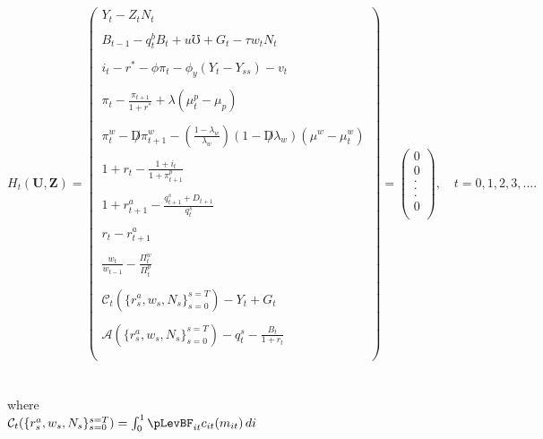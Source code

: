 \documentclass[titlepage]{\econtex}\providecommand{\texname}{BufferStockTheory}
\begin{document}
$$
H_{t}(\mathbf{U},\mathbf{Z})= \begin{pmatrix} 
 Y_{t} - Z_{t}N_{t} \\ \\ 
B_{t-1} - q^{b}_{t}B_{t} + u\mho + G_{t} - \tau w_{t} N_{t} \\ \\  
i_{t} - r^{*} - \phi \pi_{t} -\phi_{y}(Y_{t}-Y_{ss}) - v_{t} \\ \\
\pi_{t} -\frac{\pi_{t+1}}{1+r^{*}} + \lambda(\mu_{t}^{p} -\mu_{p})  \\ \\
 \pi_{t}^{w} -\not D \pi_{t+1}^{w} -(\frac{1-\lambda_{w}}{\lambda_{w}}) (1- \not D \lambda_{w}) (\mu^{w} -\mu_{t}^{w}) \\ \\
    1+r_{t} - \frac{1 + i_{t}}{1+ \pi^{p}_{t+1}}\\ \\
 1+r_{t+1}^{a} - \frac{q_{t+1}^{s} +D_{t+1}}{q_{t}^{s}} \\ \\
 r_{t} - r_{t+1}^{a} \\ \\
 \frac{w_{t}}{w_{t-1}} - \frac{\Pi_{t}^{w}}{\Pi_{t}^{p}} \\ \\
 \mathcal{C}_{t}(\{r_{s}^{a} ,w_{s}, N_{s}\}_{s=0}^{s=T}) - Y_{t} + G_{t}  \\ \\
  \mathcal{A}(\{r_{s}^{a} ,w_{s}, N_{s}\}_{s=0}^{s=T}) - q_{t}^{s} - \frac{B_{t}}{1+r_{t}}  \\ \\
 \end{pmatrix} = \begin{pmatrix} 0 \\ 0 \\. \\. \\. \\ 0\\ \end{pmatrix} , \quad t=0,1 ,2,3,....
$$ \\ \\
 

 
 where \\
 
 $\mathcal{C}_{t}(\{r_{s}^{a} ,w_{s}, N_{s}\}_{s=0}^{s=T}) = \int_{0}^{1} \pLevBF_{it} c_{it}(m_{it})\, di $ \\
 
\end{document}
